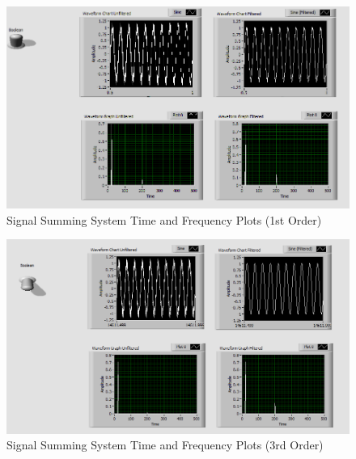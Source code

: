 \documentclass[12pt]{article}
\begin{document}
\newpage

\begin{figure}[h!] %
   \centering
   \includegraphics[width=6in]{lab_4b_1st_order.PNG} 
   \caption{Signal Summing System Time and Frequency Plots (1st Order)}
   \label{fig:example}
\end{figure}

\begin{figure}[h!] %
   \centering
   \includegraphics[width=6in]{lab_4b_3rd_order.PNG} 
   \caption{Signal Summing System Time and Frequency Plots (3rd Order)}
   \label{fig:example}
\end{figure}



\newpage

%
%
%
%
\end{document}
